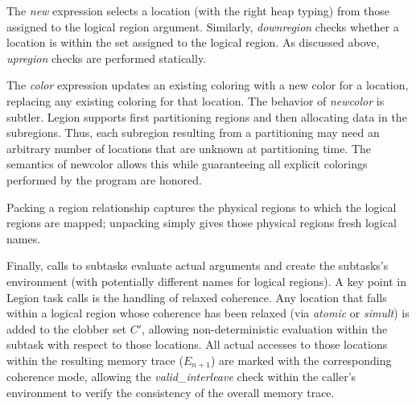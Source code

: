 The {\em new} expression selects a location (with the right heap typing) from those assigned to 
the logical region argument.
Similarly, {\em downregion} checks whether a location is within the set assigned to the logical region.
As discussed above, 
{\em upregion} checks are performed statically.

%
The {\em color} expression updates an existing coloring with a new color for a location, replacing any
existing coloring for that location.  The behavior of {\em newcolor} is subtler.
Legion supports first partitioning regions and then allocating data in the subregions.
Thus, each subregion resulting from a partitioning may need an arbitrary number of locations that are
unknown at partitioning time.  The semantics of newcolor allows this while
guaranteeing all explicit colorings performed by the program are honored.

Packing a region relationship captures the physical regions to which the logical regions are mapped;
unpacking simply gives those physical regions fresh logical names. 

Finally, calls to subtasks evaluate actual arguments and create the subtasks's
environment (with potentially different names for logical regions).  A key point in Legion task calls is the
handling of relaxed coherence.  Any location that falls within
a logical region whose coherence has been relaxed (via {\em atomic} or {\em simult}) is added to the clobber set
$C'$, allowing non-deterministic evaluation within the subtask with respect to those locations.  All actual accesses
to those locations within the resulting memory trace ($E_{n+1}$) are marked with the corresponding coherence mode,
allowing the {\em valid\_interleave} check within the caller's environment to verify the consistency of the overall
memory trace.

